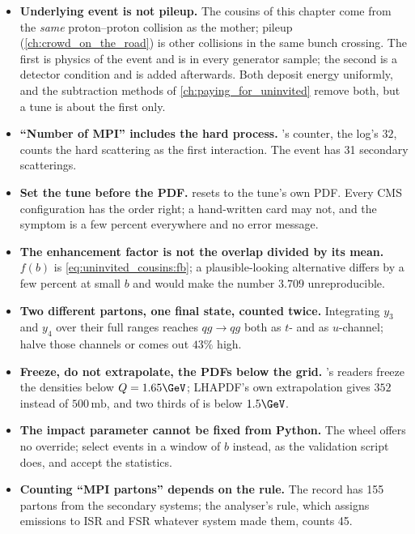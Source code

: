 \begin{pitfalls}
\begin{itemize}[nosep]
  \item \textbf{Underlying event is not pileup.} The cousins of this
    chapter come from the \emph{same} proton--proton collision as the
    mother; pileup (\cref{ch:crowd_on_the_road}) is other collisions in the
    same bunch crossing. The first is physics of the event and is in every
    generator sample; the second is a detector condition and is added
    afterwards. Both deposit energy uniformly, and the subtraction methods
    of \cref{ch:paying_for_uninvited} remove both, but a tune is about the
    first only.
  \item \textbf{``Number of MPI'' includes the hard process.} \PYTHIA's
    counter, the \CMSSW log's $32$, counts the hard scattering as the first
    interaction. The event has 31 secondary scatterings.
  \item \textbf{Set the tune before the PDF.}  resets
     to the tune's own PDF. Every CMS configuration has the
    order right; a hand-written \PYTHIA card may not, and the symptom is a
    few percent everywhere and no error message.
  \item \textbf{The enhancement factor is not the overlap divided by its
    mean.} $f(b)$ is \cref{eq:uninvited_cousins:fb}; a plausible-looking
    alternative differs by a few percent at small $b$ and would make the
    \CMSSW number $3.709$ unreproducible.
  \item \textbf{Two different partons, one final state, counted twice.}
    Integrating $y_3$ and $y_4$ over their full ranges reaches $qg\to qg$
    both as $t$- and as $u$-channel; halve those channels or \sigint comes
    out $43\%$ high.
  \item \textbf{Freeze, do not extrapolate, the PDFs below the grid.}
    \PYTHIA's readers freeze the densities below $Q=1.65\GeV$; LHAPDF's own
    extrapolation gives $352$ instead of $500\,\mathrm{mb}$, and two thirds
    of \sigint is below $1.5\GeV$.
  \item \textbf{The impact parameter cannot be fixed from Python.} The
     wheel offers no  override; select
    events in a window of $b$ instead, as the validation script does, and
    accept the statistics.
  \item \textbf{Counting ``MPI partons'' depends on the rule.} The record
    has 155 partons from the secondary systems; the analyser's rule, which
    assigns emissions to ISR and FSR whatever system made them, counts 45.

\end{itemize}
\end{pitfalls}

